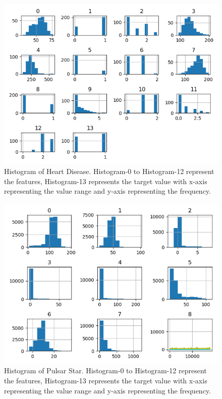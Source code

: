 \documentclass[conference]{IEEEtran}
\begin{document}
    \begin{figure}[h!]
        \includegraphics[width=\linewidth]{heart.png}
        \caption{Histogram of Heart Disease. Histogram-0 to Histogram-12 represent the features, Histogram-13 represents the target value with
        x-axis representing the value range and y-axis representing the frequency.}
        \label{histogram of Heart Disease data}
    \end{figure}
    \begin{figure}[h!]
        \includegraphics[width=\linewidth]{star.png}
        \caption{Histogram of Pulsar Star. Histogram-0 to Histogram-12 represent the features, Histogram-13 represents the target value with
        x-axis representing the value range and y-axis representing the frequency.}
        \label{histogram of Heart Disease data}
    \end{figure}
    
\end{document}
